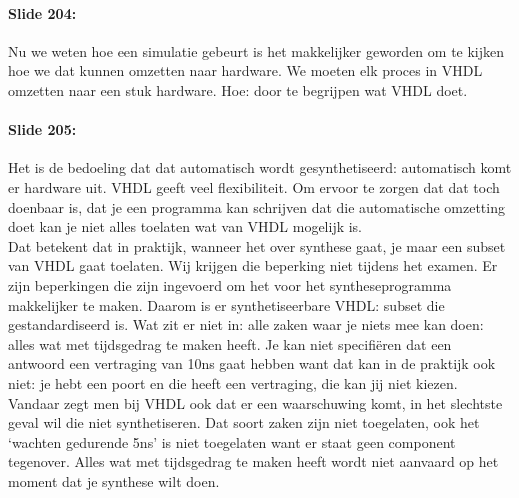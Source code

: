 \documentclass[10pt,a4paper]{book}
\begin{document}
\paragraph{Slide 204:} Nu we weten hoe een simulatie gebeurt is het makkelijker geworden om te kijken hoe we dat kunnen omzetten naar hardware. We moeten elk proces in VHDL omzetten naar een stuk hardware. Hoe: door te begrijpen wat VHDL doet. 

\paragraph{Slide 205:} Het is de bedoeling dat dat automatisch wordt gesynthetiseerd: automatisch komt er hardware uit. VHDL geeft veel flexibiliteit. Om ervoor te zorgen dat dat toch doenbaar is, dat je een programma kan schrijven dat die automatische omzetting doet kan je niet alles toelaten wat van VHDL mogelijk is.\\
Dat betekent dat in praktijk, wanneer het over synthese gaat, je maar een subset van VHDL gaat toelaten. Wij krijgen die beperking niet tijdens het examen. Er zijn beperkingen die zijn ingevoerd om het voor het syntheseprogramma makkelijker te maken. Daarom is er synthetiseerbare VHDL: subset die gestandardiseerd is. Wat zit er niet in: alle zaken waar je niets mee kan doen: alles wat met tijdsgedrag te maken heeft. Je kan niet specifi\"eren dat een antwoord een vertraging van 10ns gaat hebben want dat kan in de praktijk ook niet: je hebt een poort en die heeft een vertraging, die kan jij niet kiezen. Vandaar zegt men bij VHDL ook dat er een waarschuwing komt, in het slechtste geval wil die niet synthetiseren. Dat soort zaken zijn niet toegelaten, ook het `wachten gedurende 5ns' is niet toegelaten want er staat geen component tegenover. Alles wat met tijdsgedrag te maken heeft wordt niet aanvaard op het moment dat je synthese wilt doen.
\end{document}
